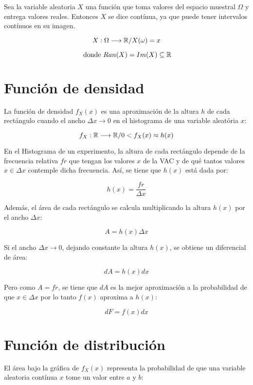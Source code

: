 \documentclass[a5paper,12pt,twoside]{book}
\begin{document}
Sea la variable aleatoria $X$ una función que toma valores del espacio muestral $\Omega$ y entrega valores reales. Entonces $X$ se dice contínua, ya que puede tener intervalos contínuos en su imagen.

\begin{equation}
X: \Omega \longrightarrow \mathbb{R} / X(\omega) = x
\end{equation}

$$ \text{ donde } Ran(X)=Im(X) \subseteq \mathbb{R} $$

\section{Función de densidad}

La función de densidad $f_X(x)$ es una aproximación de la altura $h$ de cada rectángulo cuando el ancho $\Delta x \to 0$ en el histograma de una variable aleatória $x$:

\begin{equation}
f_X: \mathbb{R} \longrightarrow \mathbb{R} / 0<f_X(x) \approx h(x)
\end{equation}

En el Histograma de un experimento, la altura de cada rectángulo depende de la frecuencia relativa $fr$ que tengan los valores $x$ de la VAC y de qué tantos valores $x \in \Delta x$ contemple dicha frecuencia. Así, se tiene que $h(x)$ está dada por:

$$ h(x) = \dfrac{fr}{\Delta x} $$

Además, el área de cada rectángulo se calcula multiplicando la altura $h(x)$ por el ancho $\Delta x$:

$$ A = h(x) \Delta x $$

Si el ancho $\Delta x \to 0$, dejando constante la altura $h(x)$, se obtiene un diferencial de área:

$$ dA = h(x) dx $$

Pero como $A=fr$, se tiene que $dA$ es la mejor aproximación a la probabilidad de que $x \in \Delta x$ por lo tanto $f(x)$ aproxima a $h(x)$:

\begin{equation}
dF=f(x) dx
\end{equation}

\section{Función de distribución}

El área bajo la gráfica de $f_X(x)$ representa la probabilidad de que una variable aleatoria contínua $x$ tome un valor entre $a$ y $b$:
\end{document}
